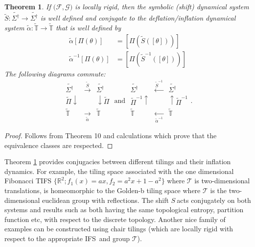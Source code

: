 \documentclass{amsproc}
\newtheorem{theorem}{Theorem}
\theoremstyle{plain}
\theoremstyle{definition}
\numberwithin{equation}{section}
\begin{document}
\begin{theorem}
\label{conj1}If $(\mathcal{F},\mathcal{G)}$ is locally rigid, then the
symbolic (shift) dynamical system $\widetilde{S}:\widetilde{\Sigma^{\dag}}%
\rightarrow\widetilde{\Sigma^{\dag}}$ is well defined and conjugate to the
deflation/inflation dynamical system $\widetilde{\alpha}:\widetilde{\mathbb{T%
}}\rightarrow\widetilde{\mathbb{T}}$ that is well defined by 
\begin{align*}
\widetilde{\alpha}\left[ \Pi(\theta)\right] & =\left[ \Pi(\widetilde{S}(%
\left[ \theta\right] ))\right] \\
\widetilde{\alpha}^{-1}\left[ \Pi(\theta)\right] & =\left[ \Pi (\widetilde{S}%
^{-1}(\left[ \theta\right] ))\right]
\end{align*}
The following diagrams commute:%
\begin{equation*}
\begin{array}{ccc}
\widetilde{\Sigma^{\dag}} & \overset{\widetilde{S}}{\rightarrow} & 
\widetilde{\Sigma^{\dag}} \\ 
\widetilde{\Pi}\downarrow &  & \downarrow\widetilde{\Pi} \\ 
\widetilde{\mathbb{T}} & \underset{\widetilde{\alpha}}{\rightarrow} & 
\widetilde{\mathbb{T}}%
\end{array}
\text{ and }%
\begin{array}{ccc}
\widetilde{\Sigma^{\dag}} & \overset{\widetilde{S}^{-1}}{\longleftarrow} & 
\widetilde{\Sigma^{\dag}} \\ 
\widetilde{\Pi}^{-1}\uparrow &  & \uparrow\widetilde{\Pi}^{-1} \\ 
\widetilde{\mathbb{T}} & \underset{\widetilde{\alpha}^{-1}}{\longleftarrow}
& \widetilde{\mathbb{T}}%
\end{array}
\text{.}
\end{equation*}
\end{theorem}

\begin{proof}
Follows from Theorem 10 and calculations which prove that the equivalence
classes are respected.
\end{proof}

Theorem \ref{conj1} provides conjugacies between different tilings and their
inflation dynamics. For example, the tiling space associated with the one
dimensional Fibonacci TIFS $\{\mathbb{R}%
^{2};f_{1}(x)=ax,f_{2}=a^{2}x+1-a^{2}\}$ where $\mathcal{T}$ is
two-dimensional translations, is homeomorphic to the Golden-b tiling space
where $\mathcal{T}$ is the two-dimensional euclidean group with reflections.
The shift $S\ $acts conjugately on both systems and results such as both
having the same topological entropy, partition function etc, with respect to
the discrete topology. Another nice family of examples can be constructed
using chair tilings (which are locally rigid with respect to the appropriate
IFS\ and group $\mathcal{T}$).
\end{document}

